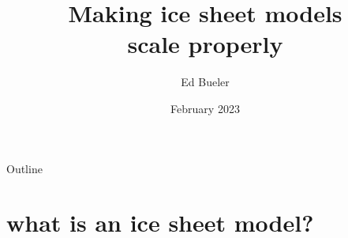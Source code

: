 \documentclass[svgnames,
               hyperref={colorlinks,citecolor=DeepPink4,linkcolor=FireBrick,urlcolor=Maroon},
               usepdftitle=false]  %
               {beamer}
\title[Making ice sheet models scale properly]{Making ice sheet models \\ scale properly}
\author{Ed Bueler}
\institute[UAF]{University of Alaska Fairbanks}
\date[]{February 2023}
\begin{document}
\beamertemplatenavigationsymbolsempty


{
  \begin{frame}
    \titlepage
  \end{frame}
}

\begin{frame}{Outline}
  \tableofcontents[hideallsubsections]
\end{frame}


\section{what is an ice sheet model?}
\end{document}
